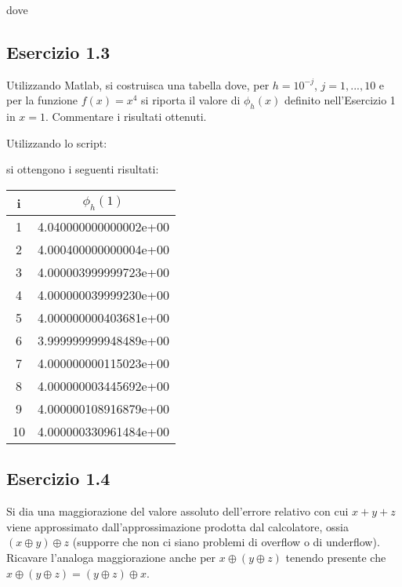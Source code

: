 
	dove


\TODO


	\subsection{Esercizio 1.3}
	
Utilizzando Matlab, si costruisca una tabella dove, per $h = 10^{-j}$, $j =1, . . . , 10$ e per la funzione $f(x) = x^{4}$ si riporta il valore di $\phi_h(x)$ definito nell'Esercizio 1 in $x = 1$. Commentare i risultati ottenuti.

Utilizzando lo script:

si ottengono i seguenti risultati:
\begin{tabular}{ c | c }
i & $\phi_h(1)$ \\
\hline
1  & 4.040000000000002e+00 \\
2  & 4.000400000000004e+00 \\
3  & 4.000003999999723e+00 \\
4  & 4.000000039999230e+00 \\
5  & 4.000000000403681e+00 \\
6  & 3.999999999948489e+00 \\
7  & 4.000000000115023e+00 \\
8  & 4.000000003445692e+00 \\
9  & 4.000000108916879e+00 \\
10 & 4.000000330961484e+00 \\
\end{tabular}

	\subsection{Esercizio 1.4}
	
Si dia una maggiorazione del valore assoluto dell’errore relativo con cui $x + y + z$ viene approssimato dall’approssimazione prodotta dal calcolatore, ossia $(x \oplus y) \oplus z$ (supporre che non ci siano problemi di overflow o di underflow). Ricavare l’analoga maggiorazione anche per $x \oplus (y \oplus z)$ tenendo presente che $x \oplus (y \oplus z) = (y \oplus z) \oplus x$.

